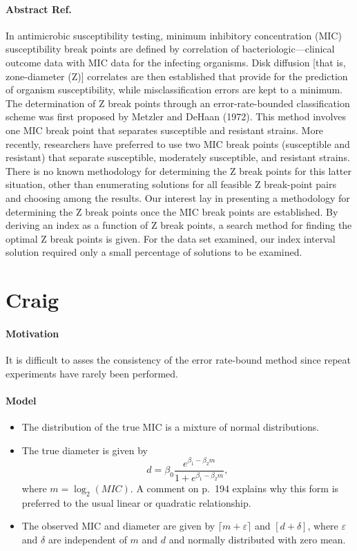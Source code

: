 \documentclass[a4paper]{article}
\begin{document}
\paragraph{Abstract Ref.~\cite{Brunden1992}} In antimicrobic susceptibility testing, minimum inhibitory concentration (MIC) susceptibility break points are defined by correlation of bacteriologic—clinical outcome data with MIC data for the infecting organisms. Disk diffusion [that is, zone-diameter (Z)] correlates are then established that provide for the prediction of organism susceptibility, while misclassification errors are kept to a minimum. The determination of Z break points through an error-rate-bounded classification scheme was first proposed by Metzler and DeHaan (1972). This method involves one MIC break point that separates susceptible and resistant strains. More recently, researchers have preferred to use two MIC break points (susceptible and resistant) that separate susceptible, moderately susceptible, and resistant strains. There is no known methodology for determining the Z break points for this latter situation, other than enumerating solutions for all feasible Z break-point pairs and choosing among the results. Our interest lay in presenting a methodology for determining the Z break points once the MIC break points are established. By deriving an index as a function of Z break points, a search method for finding the optimal Z break points is given. For the data set examined, our index interval solution required only a small percentage of solutions to be examined.



\section{Craig \cite{Craig2000}}
\paragraph{Motivation} It is difficult to asses the consistency of the error rate-bound method since repeat experiments have rarely been performed.
\paragraph{Model}
\begin{itemize}
	\item The distribution of the true MIC is a mixture of normal distributions.
	\item The true diameter is given by $$d=\beta_0\frac{e^{\beta_1-\beta_2m}}{1+e^{\beta_1-\beta_2m}},$$ where $m=\log_2(MIC)$. A comment on p.\ 194 explains why this form is preferred to the usual linear or quadratic relationship.
	\item The observed MIC and diameter are given by $\lceil m+\varepsilon\rceil$ and $[d+\delta]$, where $\varepsilon$ and $\delta$ are independent of $m$ and $d$ and normally distributed with zero mean.
\end{itemize}
\end{document}
